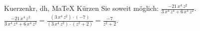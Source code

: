\begin{MAufgabe}{Kuerzen}{kr, dh, MaTeX}
K\"urzen Sie soweit m\"oglich: $\frac{- 21\, x^4\, z^2}{3\, x^4\, z^4 + 6\, x^4\, z^2}$.\\ 
\ifLsg\MLoesung
\quad $\frac{- 21\, x^4\, z^2}{3\, x^4\, z^4 + 6\, x^4\, z^2}=\frac{(3\, x^4\, z^2)\cdot(-7)}{(3\, x^4\, z^2)\cdot(z^2 + 2)}=\frac{-7}{z^2 + 2}$.\else\relax\fi
 \end{MAufgabe}